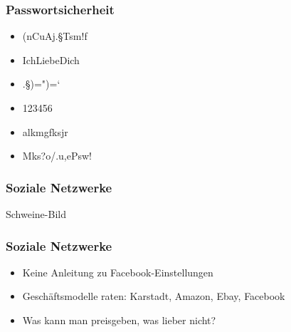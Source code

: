 \documentclass[12pt]{beamer}
\begin{document}
\begin{frame}
  \frametitle{Passwortsicherheit}
  \begin{itemize}
    \item (nCuAj.§Tsm!f
    \item IchLiebeDich
    \item .§)=")=`
    \item 123456
    \item alkmgfksjr
    \item Mks?o/.u,ePsw!
  \end{itemize}
\end{frame}

\begin{frame}
  \frametitle{Soziale Netzwerke}
  Schweine-Bild
\end{frame}

\begin{frame}
  \frametitle{Soziale Netzwerke}
  \begin{itemize}
    \item Keine Anleitung zu Facebook-Einstellungen
    \item Geschäftsmodelle raten: Karstadt, Amazon, Ebay, Facebook
    \item Was kann man preisgeben, was lieber nicht?
  \end{itemize}
\end{frame}
\end{document}

